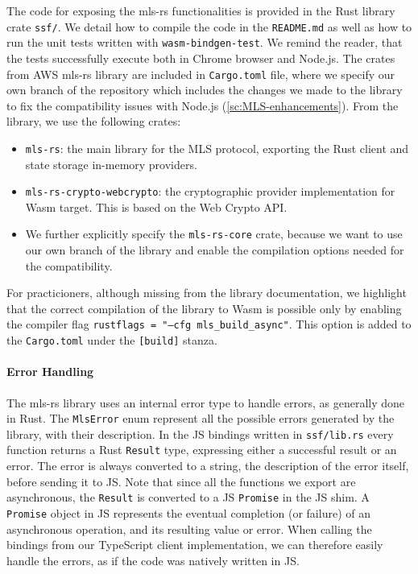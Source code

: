 The code for exposing the mls-rs functionalities is provided in the Rust library crate
\texttt{ssf/}. We detail how to compile the code in the \texttt{README.md}
as well as how to run the unit tests written with \texttt{wasm-bindgen-test}.
We remind the reader, that the tests successfully execute both in Chrome browser and Node.js.
The crates from AWS mls-rs library are included in \texttt{Cargo.toml}
file, where we specify our own branch of the repository which 
includes the changes we made to the library to fix the compatibility issues
with Node.js (\cref{sc:MLS-enhancements}). From the library, we use the following crates:
\begin{itemize}
    \item \texttt{mls-rs}: the main library for the MLS protocol, exporting the Rust client and state storage in-memory providers.
    \item \texttt{mls-rs-crypto-webcrypto}: the cryptographic provider implementation for Wasm target. This is based on the Web Crypto API.
    \item We further explicitly specify the \texttt{mls-rs-core} crate, because we want to use our own branch of the library and enable the compilation options needed for the compatibility.
\end{itemize}

For practicioners, although missing from the library documentation, we highlight that
the correct compilation of the library to Wasm is possible only by enabling the
compiler flag \texttt{rustflags = "--cfg mls\_build\_async"}. This option is added
to the \texttt{Cargo.toml} under the \texttt{[build]} stanza.

\paragraph{Error Handling}
The mls-rs library uses an internal error type to handle errors, as generally
done in Rust. The \texttt{MlsError} enum represent all the possible errors generated
by the library, with their description.
In the JS bindings written in \texttt{ssf/lib.rs} every function returns a Rust
\texttt{Result} type, expressing either a successful result or an error.
The error is always converted to a string, the description of the error itself,
before sending it to JS. 
Note that since all the functions we export are asynchronous,
the \texttt{Result} is converted to a JS \texttt{Promise} in the JS shim.
A \texttt{Promise} object in JS represents the eventual completion (or failure) 
of an asynchronous operation, and its resulting value or error.
When calling the bindings from our TypeScript client implementation,
we can therefore easily handle the errors,
as if the code was natively written in JS.

